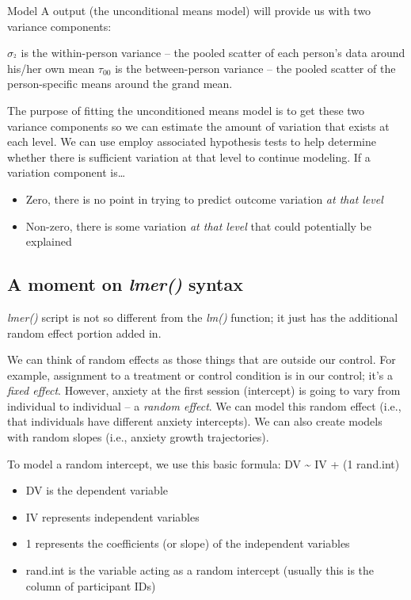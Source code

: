 \documentclass[
  english,
]{book}
\providecommand{\tightlist}{%
  \setlength{\itemsep}{0pt}\setlength{\parskip}{0pt}}
\begin{document}
Model A output (the unconditional means model) will provide us with two variance components:

\(\sigma _^2\) is the within-person variance -- the pooled scatter of each person's data around his/her own mean
\(\tau _{00}\) is the between-person variance -- the pooled scatter of the person-specific means around the grand mean.

The purpose of fitting the unconditioned means model is to get these two variance components so we can estimate the amount of variation that exists at each level. We can use employ associated hypothesis tests to help determine whether there is sufficient variation at that level to continue modeling. If a variation component is\ldots{}

\begin{itemize}
\tightlist
\item
  Zero, there is no point in trying to predict outcome variation \emph{at that level}
\item
  Non-zero, there is some variation \emph{at that level} that could potentially be explained
\end{itemize}

\hypertarget{a-moment-on-lmer-syntax}{%
\subsection{\texorpdfstring{A moment on \emph{lmer()} syntax}{A moment on lmer() syntax}}\label{a-moment-on-lmer-syntax}}

\emph{lmer()} script is not so different from the \emph{lm()} function; it just has the additional random effect portion added in.

We can think of random effects as those things that are outside our control. For example, assignment to a treatment or control condition is in our control; it's a \emph{fixed effect}. However, anxiety at the first session (intercept) is going to vary from individual to individual -- a \emph{random effect}. We can model this random effect (i.e., that individuals have different anxiety intercepts). We can also create models with random slopes (i.e., anxiety growth trajectories).

To model a random intercept, we use this basic formula: DV \textasciitilde{} IV + (1 \textbar{} rand.int)

\begin{itemize}
\tightlist
\item
  DV is the dependent variable
\item
  IV represents independent variables
\item
  1 represents the coefficients (or slope) of the independent variables
\item
  rand.int is the variable acting as a random intercept (usually this is the column of participant IDs)
\end{itemize}
\end{document}

